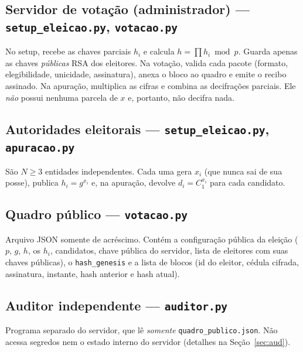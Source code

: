 \documentclass[11pt,a4paper]{article}
\begin{document}
\subsection{Servidor de votação (administrador) --- \texttt{setup\_eleicao.py}, \texttt{votacao.py}}
No setup, recebe as chaves parciais $h_i$ e calcula $h=\prod h_i \bmod p$. Guarda apenas as chaves \emph{públicas} RSA dos eleitores. Na votação, valida cada pacote (formato, elegibilidade, unicidade, assinatura), anexa o bloco ao quadro e emite o recibo assinado. Na apuração, multiplica as cifras e combina as decifrações parciais. Ele \emph{não} possui nenhuma parcela de $x$ e, portanto, não decifra nada.

\subsection{Autoridades eleitorais --- \texttt{setup\_eleicao.py}, \texttt{apuracao.py}}
São $N\ge 3$ entidades independentes. Cada uma gera $x_i$ (que nunca sai de sua posse), publica $h_i=g^{x_i}$ e, na apuração, devolve $d_i=C_1^{x_i}$ para cada candidato.

\subsection{Quadro público --- \texttt{votacao.py}}
Arquivo JSON somente de acréscimo. Contém a configuração pública da eleição ($p$, $g$, $h$, os $h_i$, candidatos, chave pública do servidor, lista de eleitores com suas chaves públicas), o \texttt{hash\_genesis} e a lista de blocos (id do eleitor, cédula cifrada, assinatura, instante, hash anterior e hash atual).

\subsection{Auditor independente --- \texttt{auditor.py}}
Programa separado do servidor, que lê \emph{somente} \texttt{quadro\_publico.json}. Não acessa segredos nem o estado interno do servidor (detalhes na Seção~\ref{sec:aud}).

\end{document}
